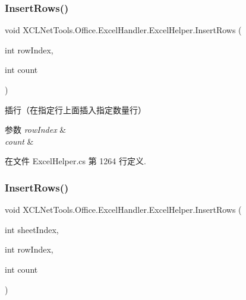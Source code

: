 \subsubsection{\texorpdfstring{Insert\+Rows()}{InsertRows()}\hspace{0.1cm}{\footnotesize\ttfamily [1/2]}}
{\footnotesize\ttfamily void X\+C\+L\+Net\+Tools.\+Office.\+Excel\+Handler.\+Excel\+Helper.\+Insert\+Rows (\begin{DoxyParamCaption}\item[{int}]{row\+Index,  }\item[{int}]{count }\end{DoxyParamCaption})}



插行（在指定行上面插入指定数量行） 


\begin{DoxyParams}{参数}
{\em row\+Index} & \\
\hline
{\em count} & \\
\hline
\end{DoxyParams}


在文件 Excel\+Helper.\+cs 第 1264 行定义.

\mbox{\label{class_x_c_l_net_tools_1_1_office_1_1_excel_handler_1_1_excel_helper_ae52b03c158a2db80aa61b3db05e9298c}} 
\subsubsection{\texorpdfstring{Insert\+Rows()}{InsertRows()}\hspace{0.1cm}{\footnotesize\ttfamily [2/2]}}
{\footnotesize\ttfamily void X\+C\+L\+Net\+Tools.\+Office.\+Excel\+Handler.\+Excel\+Helper.\+Insert\+Rows (\begin{DoxyParamCaption}\item[{int}]{sheet\+Index,  }\item[{int}]{row\+Index,  }\item[{int}]{count }\end{DoxyParamCaption})}



